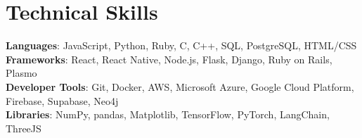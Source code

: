\documentclass[letterpaper,11pt]{article}
\begin{document}
\section{Technical Skills}
 \begin{itemize}[leftmargin=0.15in, label={}]
    \small{\item{
     \textbf{Languages}{: JavaScript, Python, Ruby, C, C++, SQL, PostgreSQL, HTML/CSS} \\
     \textbf{Frameworks}{: React, React Native, Node.js, Flask, Django, Ruby on Rails, Plasmo} \\
     \textbf{Developer Tools}{: Git, Docker, AWS, Microsoft Azure, Google Cloud Platform, Firebase, Supabase, Neo4j} \\
     \textbf{Libraries}{: NumPy, pandas, Matplotlib, TensorFlow, PyTorch, LangChain, ThreeJS}
    }}
 \end{itemize}


\end{document}
